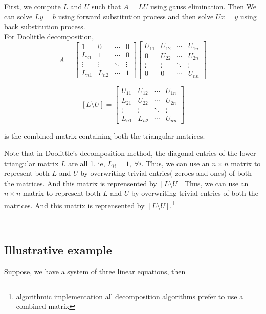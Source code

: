 	First, we compute $L$ and $U$ such that $A = LU$ using gauss elimination. Then We can solve $Ly = b$ using forward substitution process and then solve $Ux = y$ using back substitution process.\\

	For Doolittle decomposition,
	\[ A = \begin{bmatrix} 1 & 0 & \cdots & 0 \\ L_{21} & 1 & \cdots & 0 \\ \vdots & \vdots & \ddots & \vdots \\ L_{n1} & L_{n2} & \cdots & 1 \end{bmatrix} \begin{bmatrix} U_{11} & U_{12} & \cdots & U_{1n} \\ 0 & U_{22} & \cdots & U_{2n} \\ \vdots & \vdots & \ddots & \vdots \\ 0 & 0 & \cdots & U_{nn} \end{bmatrix} \]

	\[ [L\text{\textbackslash{}}U] = \begin{bmatrix} U_{11} & U_{12} & \cdots & U_{1n} \\ L_{21} & U_{22} & \cdots & U_{2n} \\ \vdots & \vdots & \ddots & \vdots \\  L_{n1} & L_{n2} & \cdots & U_{nn} \end{bmatrix} \]

	is the combined matrix containing both the triangular matrices.

	\begin{commentary}Note that in Doolittle's decomposition method, the diagonal entries of the lower triangular matrix $L$ are all 1. ie, $L_{ii} = 1,\ \forall i$. Thus, we can use an $n \times n$ matrix to represent both $L$ and $U$ by overwriting trivial entries( zeroes and ones) of both the matrices. And this matrix is reprensented by $[L\text{\textbackslash{}}U]$ Thus, we can use an $n \times n$ matrix to represent both $L$ and $U$ by overwriting trivial entries of both the matrices. And this matrix is reprensented by $[L\text{\textbackslash{}}U]$.\footnote{algorithmic implementation all decomposition algorithms prefer to use a combined matrix}\end{commentary}\\

\subsection{Illustrative example}
	Suppose, we have a system of three linear equations, then

